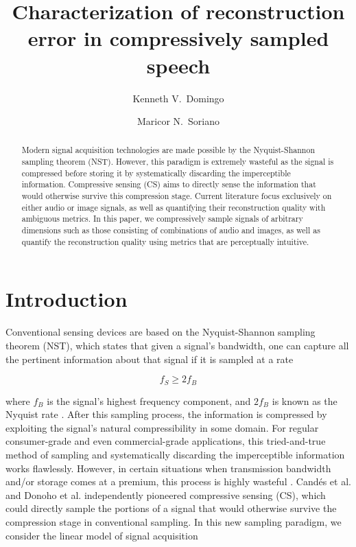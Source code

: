 \documentclass[10pt,a4paper,twoside]{article}
\begin{document}
\title{\TitleFont Characterization of reconstruction error in compressively sampled speech}

\author[*\negthickspace]{Kenneth V.~Domingo}
\author[ ]{Maricor N.~Soriano
\lastauthorsep}


\begin{abstract}
\noindent
Modern signal acquisition technologies are made possible by the Nyquist-Shannon sampling theorem (NST). However, this paradigm is extremely wasteful as the signal is compressed before storing it by systematically discarding the imperceptible information. Compressive sensing (CS) aims to directly sense the information that would otherwise survive this compression stage. Current literature focus exclusively on either audio or image signals, as well as quantifying their reconstruction quality with ambiguous metrics. In this paper, we compressively sample signals of arbitrary dimensions such as those consisting of combinations of audio and images, as well as quantify the reconstruction quality using metrics that are perceptually intuitive.


\end{abstract}

\maketitle
\thispagestyle{titlestyle}

\section{Introduction}\label{sec:intro}
Conventional sensing devices are based on the Nyquist-Shannon sampling theorem (NST), which states that given a signal's bandwidth, one can capture all the pertinent information about that signal if it is sampled at a rate

\begin{equation} \label{eq:nst}
	f_S \geq 2f_B
\end{equation}

\noindent where $f_B$ is the signal's highest frequency component, and $2f_B$ is known as the Nyquist rate \cite{Shannon1949}. After this sampling process, the information is compressed by exploiting the signal's natural compressibility in some domain. For regular consumer-grade and even commercial-grade applications, this tried-and-true method of sampling and systematically discarding the imperceptible information works flawlessly. However, in certain situations when transmission bandwidth and/or storage comes at a premium, this process is highly wasteful \cite{Candes2008b}. Cand\'{e}s et al. \cite{Candes2006} and Donoho et al. \cite{Donoho2006} independently pioneered compressive sensing (CS), which could directly sample the portions of a signal that would otherwise survive the compression stage in conventional sampling. In this new sampling paradigm, we consider the linear model of signal acquisition
\end{document}
